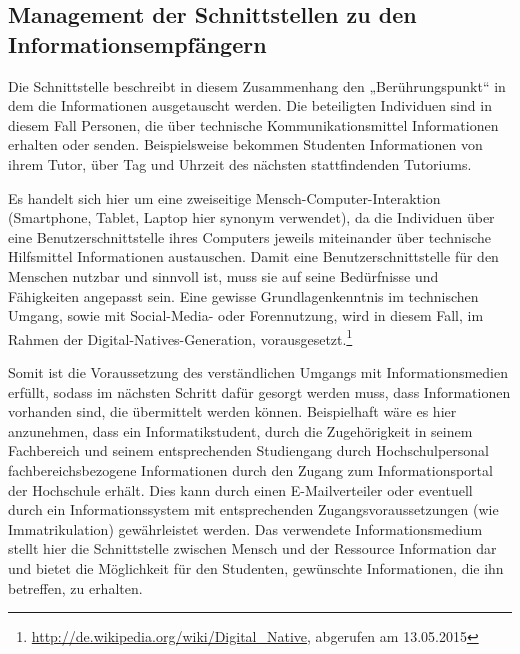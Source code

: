 \subsection{Management der Schnittstellen zu den Informationsempfängern}
Die Schnittstelle beschreibt in diesem Zusammenhang den „Berührungspunkt“ in dem die Informationen ausgetauscht werden. 
Die beteiligten Individuen sind in diesem Fall Personen, die über technische Kommunikationsmittel Informationen erhalten oder senden. 
Beispielsweise bekommen Studenten Informationen von ihrem Tutor, über Tag und Uhrzeit des nächsten stattfindenden Tutoriums. 

Es handelt sich hier um eine zweiseitige Mensch-Computer-Interaktion (Smartphone, Tablet, Laptop hier synonym verwendet), da die Individuen über eine Benutzerschnittstelle ihres Computers jeweils miteinander über technische Hilfsmittel Informationen austauschen.
Damit eine Benutzerschnittstelle für den Menschen nutzbar und sinnvoll ist, muss sie auf seine Bedürfnisse und Fähigkeiten angepasst sein. 
Eine gewisse Grundlagenkenntnis im technischen Umgang, sowie mit Social-Media- oder Forennutzung, wird in diesem Fall, im Rahmen der Digital-Natives-Generation, vorausgesetzt.\footnote{\url{http://de.wikipedia.org/wiki/Digital_Native}, abgerufen am 13.05.2015}

Somit ist die Voraussetzung des verständlichen Umgangs mit Informationsmedien erfüllt, sodass im nächsten Schritt dafür gesorgt werden muss, dass Informationen vorhanden sind, die übermittelt werden können. 
Beispielhaft wäre es hier anzunehmen, dass ein Informatikstudent, durch die Zugehörigkeit in seinem Fachbereich und seinem entsprechenden Studiengang durch Hochschulpersonal fachbereichsbezogene Informationen durch den Zugang zum Informationsportal der Hochschule erhält. 
Dies kann durch einen E-Mailverteiler oder eventuell durch ein Informationssystem mit entsprechenden Zugangsvoraussetzungen (wie Immatrikulation) gewährleistet werden. 
Das verwendete Informationsmedium stellt hier die Schnittstelle zwischen Mensch und der Ressource Information dar und bietet die Möglichkeit für den Studenten, gewünschte Informationen, die ihn betreffen, zu erhalten.

